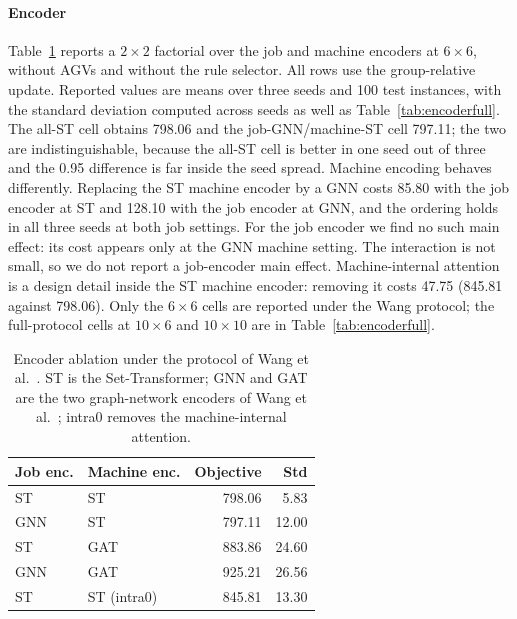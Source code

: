 \paragraph{Encoder} Table~\ref{tab:encoder} reports a $2\times2$ factorial
over the job and machine encoders at $6\times6$, without AGVs and without the
rule selector. All rows use the group-relative update. Reported values are means over three seeds and 100 test instances, 
with the standard deviation computed across seeds as well as Table~\ref{tab:encoderfull}. 
The all-ST cell obtains 798.06 and the job-GNN/machine-ST cell
797.11; the two are indistinguishable, because the all-ST cell is better in
one seed out of three and the 0.95 difference is far inside the seed spread.
Machine encoding behaves differently. Replacing the ST machine encoder by a
GNN costs
85.80 with the job encoder at ST and 128.10 with the job encoder at GNN, and
the ordering holds in all three seeds at both job settings. For the job
encoder we find no such main effect: its cost appears only at the GNN machine
setting. The interaction is not small, so we do not report a
job-encoder main effect. Machine-internal attention is a design detail inside the ST
machine encoder: removing it costs 47.75 (845.81 against 798.06). Only the
$6\times6$ cells are reported under the Wang protocol; the full-protocol cells
at $10\times6$ and $10\times10$ are in Table~\ref{tab:encoderfull}.

\begin{table}[t]
\centering
\caption{Encoder ablation under the protocol of Wang et
al.~\cite{wang2025multitarget}. ST is the Set-Transformer; GNN
and GAT are the two graph-network encoders of Wang et
al.~\cite{wang2025multitarget}; intra0 removes the machine-internal attention.}
\label{tab:encoder}
\begin{tabular}{llrr}
\toprule
Job enc. & Machine enc. & Objective & Std \\
\midrule
ST & ST & 798.06 & 5.83 \\
GNN & ST & 797.11 & 12.00 \\
ST & GAT & 883.86 & 24.60 \\
GNN & GAT & 925.21 & 26.56 \\
ST & ST (intra0) & 845.81 & 13.30 \\
\bottomrule
\end{tabular}
\end{table}

